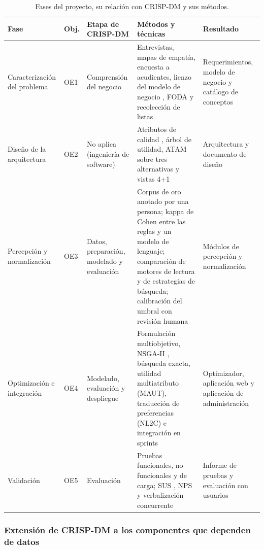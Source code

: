 \begin{table}[H]
\centering\footnotesize
\setlength{\tabcolsep}{4pt}
\renewcommand{\arraystretch}{1.1}
\caption{Fases del proyecto, su relación con CRISP-DM y sus métodos.}
\label{tab:fases}
\begin{tabularx}{\textwidth}{@{}p{2.3cm}p{0.8cm}p{2.4cm}Xp{2.9cm}@{}}
\toprule
Fase & Obj. & Etapa de CRISP-DM & Métodos y técnicas & Resultado \\
\midrule
Caracterización del problema & OE1 & Comprensión del negocio &
Entrevistas, mapas de empatía, encuesta a acudientes, lienzo del modelo de negocio
\citep{osterwalder_business_2010}, FODA y recolección de listas &
Requerimientos, modelo de negocio y catálogo de conceptos \\
Diseño de la arquitectura & OE2 & No aplica (ingeniería de software) &
Atributos de calidad \citep{richards_fundamentals_2025,iso_25010_2011}, árbol de
utilidad, ATAM sobre tres alternativas \citep{bass_software_2021} y vistas 4+1
\citep{kruchten_41_1995} &
Arquitectura y documento de diseño \\
Percepción y normalización & OE3 & Datos, preparación, modelado y evaluación &
Corpus de oro anotado por una persona; kappa de Cohen \citep{cohen_coefficient_1960} entre
las reglas y un modelo de lenguaje; comparación de motores de lectura y de estrategias de
búsqueda; calibración del umbral con revisión humana &
Módulos de percepción y normalización \\
Optimización e integración & OE4 & Modelado, evaluación y despliegue &
Formulación multiobjetivo, NSGA-II \citep{deb_fast_2002}, búsqueda exacta, utilidad
multiatributo (MAUT), traducción de preferencias (NL2C) e integración en sprints &
Optimizador, aplicación web y aplicación de administración \\
Validación & OE5 & Evaluación &
Pruebas funcionales, no funcionales y de carga; SUS \citep{brooke_sus_1996}, NPS
\citep{reichheld_one_2003} y verbalización concurrente \citep{lazar_research_2017} &
Informe de pruebas y evaluación con usuarios \\
\bottomrule
\end{tabularx}
\end{table}

\subsubsection{Extensión de CRISP-DM a los componentes que dependen de datos}
\label{sec:crispdm-extension}

